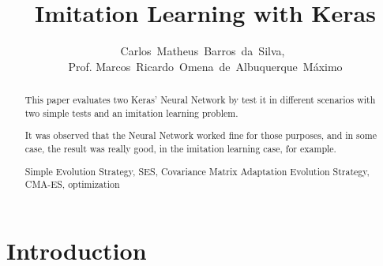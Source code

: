 \documentclass[journal]{IEEEtran}
\begin{document}
    \title{Imitation Learning with Keras}
  \author{Carlos~Matheus~Barros~da~Silva,~\\Prof. Marcos~Ricardo~Omena~de~Albuquerque~Máximo}


\maketitle



\begin{abstract}

This paper evaluates two Keras' Neural Network by test it in different scenarios with two simple tests and an imitation learning problem.

It was observed that the Neural Network worked fine for those purposes, and in some case, the result was really good, in the imitation learning case, for example.

\begin{IEEEkeywords}
    Simple Evolution Strategy, SES, Covariance Matrix Adaptation Evolution Strategy, CMA-ES, optimization
\end{IEEEkeywords}
\end{abstract}

\IEEEpeerreviewmaketitle



\section{Introduction}
\end{document}

